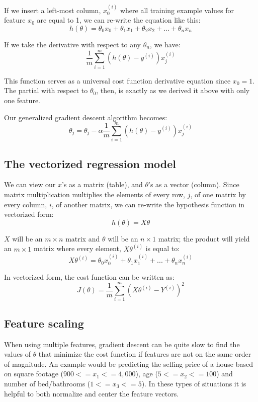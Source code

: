 \documentclass[11pt]{article}
\begin{document}
If we insert a left-most column, \(x^{(i)}_0\) where all training example values for
feature \(x_0\) are equal to 1, we can re-write the equation like this:
\[
h(\theta) = \theta_0 x_0 + \theta_1 x_1 + \theta_2 x_2 + ... + \theta_n x_n
\]

If we take the derivative with respect to any \(\theta_n\), we have:
\[
\frac{1}{m} \sum_{i=1}^m \left(h(\theta) - y^{(i)} \right) x^{(i)}_j
\]

This function serves as a universal cost function derivative equation since \(x_0 =
1\). The partial with respect to \(\theta_0\), then, is exactly as we derived it
above with only one feature.

Our generalized gradient descent algorithm becomes:
\[
\theta_j = \theta_j - \alpha \frac{1}{m} \sum_{i=1}^m \left(h(\theta) - y^{(i)} \right) x^{(i)}_j 
\]
\subsection{The vectorized regression model}
\label{sec-2-2}


We can view our \(x\)'s as a matrix (table), and \(\theta\)'s as a vector
(column). Since matrix multiplication multiplies the elements of every row, \(j\),
of one matrix by every column, \(i\), of another matrix, we can re-write
the hypothesis function in vectorized form:
\[
h(\theta) = X \theta
\]

\(X\) will be an \(m \times n\) matrix and \(\theta\) will be an \(n \times 1\)
matrix; the product will yield an \(m \times 1\) matrix where every element, \(X
\theta^{(i)}\) is equal to:
\[
X \theta^{(i)} = \theta_0 x^{(i)}_0 + \theta_1 x^{(i)}_1 + ... + \theta_n x^{(i)}_n
\]

In vectorized form, the cost function can be written as:
\[
J(\theta) = \frac{1}{m} \sum_{i=1}^m \left( X \theta^{(i)} - Y^{(i)} \right)^2
\]
\subsection{Feature scaling}
\label{sec-2-3}

When using multiple features, gradient descent can be quite slow to find the values
of \(\theta\) that minimize the cost function if features are not on the same order
of magnitude. An example would be predicting the selling price of a house based on
square footage (\(900 <= x_1 <= 4,000\)), age (\(5 <= x_2 <= 100\)) and number of
bed/bathrooms (\(1 <= x_3 <= 5\)). In these types of situations it is helpful to both
normalize and center the feature vectors.
\end{document}
